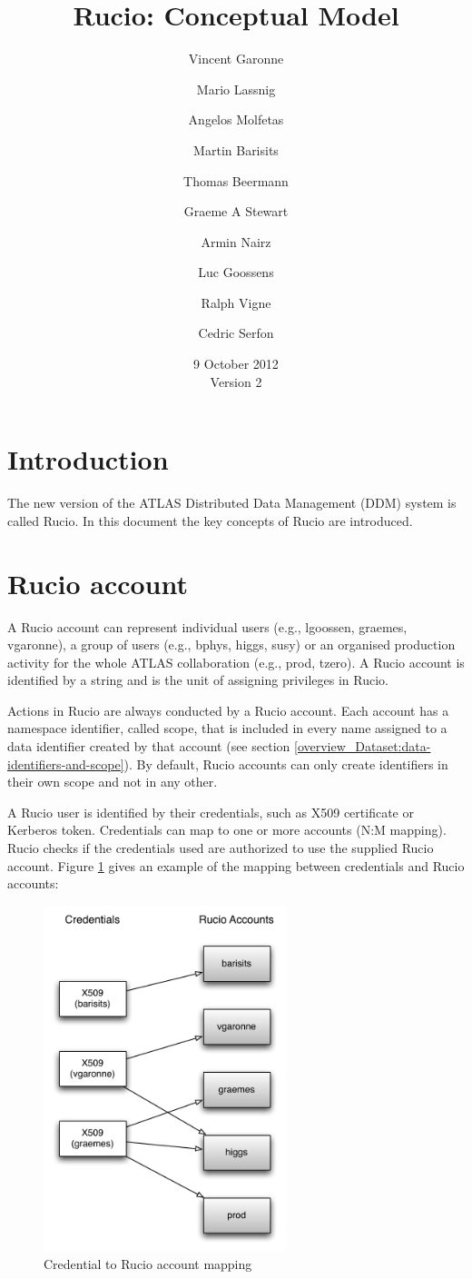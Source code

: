 \documentclass{atlasnote}
\title{Rucio: Conceptual Model}
\author[1]{Vincent Garonne}
\author[1]{Mario Lassnig}
\author[1]{Angelos Molfetas}
\author[1]{Martin Barisits}
\author[1]{Thomas Beermann}
\author[1]{Graeme A Stewart}
\author[1]{Armin Nairz}
\author[1]{Luc Goossens}
\author[1]{Ralph Vigne}
\author[1]{Cedric Serfon}
\affil[1]{PH-ADP-CO, CERN}
\date{9 October 2012\\ Version 2}
\begin{document}
\section{Introduction}

The new version of the ATLAS Distributed Data Management (DDM) system is called Rucio. In this document the key concepts of Rucio are introduced.

\section{Rucio account}
\label{overview_Rucio_account:rucio-account}

A Rucio account can represent individual users (e.g., lgoossen, graemes, vgaronne), a group of users (e.g., bphys, higgs, susy) or an organised production activity for the whole ATLAS collaboration (e.g., prod, tzero). A Rucio account is identified by a string and is the unit of assigning privileges in Rucio.

Actions in Rucio are always conducted by a Rucio account. Each account has a namespace identifier, called scope, that is included in every name assigned to a data identifier created by that account (see section \ref{overview_Dataset:data-identifiers-and-scope}). By default, Rucio accounts can only create identifiers in their own scope and not in any other.

A Rucio user is identified by their credentials, such as X509 certificate or Kerberos token. Credentials can map to one or more accounts (N:M mapping). Rucio checks if the credentials used are authorized to use the supplied Rucio account. Figure \ref{credentials} gives an example of the mapping between credentials and Rucio accounts:

\begin{figure}[h]
\begin{center}
\includegraphics[width=200pt]{accounts.pdf}
\end{center}
\caption{\label{credentials} Credential to Rucio account mapping}
\end{figure}
\end{document}
